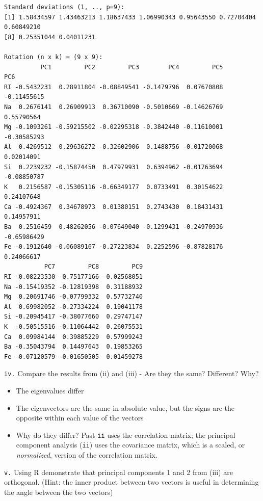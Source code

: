 \documentclass[
  letterpaper,
  DIV=11,
  numbers=noendperiod]{scrartcl}
\providecommand{\tightlist}{%
  \setlength{\itemsep}{0pt}\setlength{\parskip}{0pt}}\usepackage{longtable,booktabs,array}
\begin{document}
\begin{verbatim}
Standard deviations (1, .., p=9):
[1] 1.58434597 1.43463213 1.18637433 1.06990343 0.95643550 0.72704404 0.60849210
[8] 0.25351044 0.04011231

Rotation (n x k) = (9 x 9):
          PC1         PC2         PC3        PC4         PC5         PC6
RI -0.5432231  0.28911804 -0.08849541 -0.1479796  0.07670808 -0.11455615
Na  0.2676141  0.26909913  0.36710090 -0.5010669 -0.14626769  0.55790564
Mg -0.1093261 -0.59215502 -0.02295318 -0.3842440 -0.11610001 -0.30585293
Al  0.4269512  0.29636272 -0.32602906  0.1488756 -0.01720068  0.02014091
Si  0.2239232 -0.15874450  0.47979931  0.6394962 -0.01763694 -0.08850787
K   0.2156587 -0.15305116 -0.66349177  0.0733491  0.30154622  0.24107648
Ca -0.4924367  0.34678973  0.01380151  0.2743430  0.18431431  0.14957911
Ba  0.2516459  0.48262056 -0.07649040 -0.1299431 -0.24970936 -0.65986429
Fe -0.1912640 -0.06089167 -0.27223834  0.2252596 -0.87828176  0.24066617
           PC7         PC8         PC9
RI -0.08223530 -0.75177166 -0.02568051
Na -0.15419352 -0.12819398  0.31188932
Mg  0.20691746 -0.07799332  0.57732740
Al  0.69982052 -0.27334224  0.19041178
Si -0.20945417 -0.38077660  0.29747147
K  -0.50515516 -0.11064442  0.26075531
Ca  0.09984144  0.39885229  0.57999243
Ba -0.35043794  0.14497643  0.19853265
Fe -0.07120579 -0.01650505  0.01459278
\end{verbatim}

\texttt{iv.} Compare the results from (ii) and (iii) - Are they the
same? Different? Why?

\begin{itemize}
\tightlist
\item
  The eigenvalues differ
\item
  The eigenvectors are the same in absolute value, but the signs are the
  opposite within each value of the vectors
\item
  Why do they differ? Past \texttt{ii} uses the correlation matrix; the
  principal component analysis (\texttt{ii}) uses the covariance matrix,
  which is a scaled, or \emph{normalized}, version of the correlation
  matrix.
\end{itemize}

\texttt{v.} Using R demonstrate that principal components 1 and 2 from
(iii) are orthogonal. (Hint: the inner product between two vectors is
useful in determining the angle between the two vectors)
\end{document}
